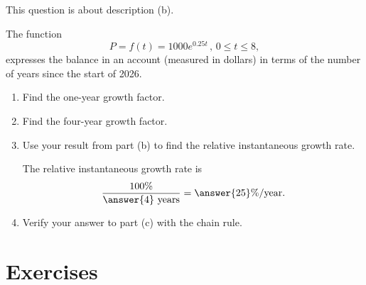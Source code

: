 \documentclass{ximera}
\begin{document}
\begin{question} \label{Qdefer3rv}
This question is about description (b).

The function
\[
    P = f(t) = 1000e^{0.25t} \, , \,  0\leq t \leq 8 ,
\]
expresses the balance in an account (measured in dollars) in terms of the number of years since the start of 2026.

\begin{enumerate}

\item Find the one-year growth factor.

\item Find the four-year growth factor.

\item Use your result from part (b) to find the relative instantaneous growth rate.

The relative instantaneous growth rate is
\[
    \frac{100\%}{\answer{4}\text{ years}} = \answer{25}\% / \text{year}.
\]

\item Verify your answer to part (c) with the chain rule.
\end{enumerate}
\end{question}


\section{Exercises}




\end{document}
